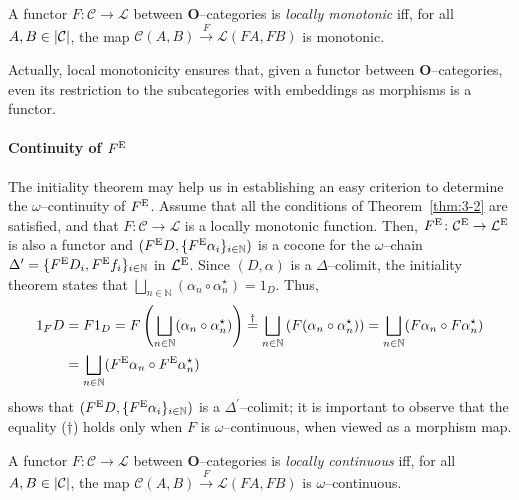 \begin{dfn}
  A functor \(F \colon \mathcal{C} \to \mathcal{L}\) between \(\mathbf{O}\)--categories is \emph{locally monotonic} iff, for all \(A, B \in \lvert \mathcal{C} \rvert\), the map \(\mathcal{C}(A,B) \overset{F}{\to}\mathcal{L}(FA,FB)\) is monotonic.
\end{dfn}

Actually, local monotonicity ensures that, given a functor between \(\mathbf{O}\)--categories, even its restriction to the subcategories with embeddings as morphisms is a functor.

\paragraph{Continuity of \(F^\textup{E}\)}
The initiality theorem may help us in establishing an easy criterion to determine the \(\omega{}\)--continuity of \(F^\textup{E}\).
Assume that all the conditions of Theorem~\ref{thm:3-2} are satisfied, and that \(F \colon \mathcal{C} \to \mathcal{L}\) is a locally monotonic function.
Then, \(F^\textup{E} \colon \mathcal{C}^\textup{E} \to \mathcal{L}^\textup{E}\) is also a functor and \((F^\textup{E}D, \lbrace F^\textup{E}\alpha_i\rbrace_{i \in \mathbb{N}})\) is a cocone for the \(\omega{}\)--chain \(\Delta^\prime = \lbrace F^\textup{E} D_i, F^\textup{E}f_i \rbrace_{i \in \mathbb{N}}\) in \(\mathcal{L}^\textup{E}\).
Since \((D,\alpha)\) is a \(\Delta{}\)--colimit, the initiality theorem states that \(\bigsqcup_{n \in \mathbb{N}}(\alpha_n \circ \alpha_n^\star) = 1_D\).
Thus,
\begin{equation*}
  \begin{split}
    1_FD &= F1_D = F\left(\bigsqcup_{n \in \mathbb{N}}(\alpha_n \circ \alpha_n^\star)\right) \overset{\dagger}{=} \bigsqcup_{n \in \mathbb{N}}\left(F(\alpha_n \circ \alpha_n^\star)\right) = \bigsqcup_{n \in \mathbb{N}}(F\alpha_n \circ F\alpha_n^\star) \\
    &= \bigsqcup_{n \in \mathbb{N}}(F^\textup{E}\alpha_n \circ F^\textup{E}\alpha_n^\star)
  \end{split}
\end{equation*}
shows that \((F^\textup{E}D, \lbrace F^\textup{E}\alpha_i\rbrace_{i \in \mathbb{N}})\) is a \(\Delta^\prime{}\)--colimit; it is important to observe that the equality (\(\dagger{}\)) holds only when \(F\) is \(\omega{}\)--continuous, when viewed as a morphism map.

\begin{dfn}
  A functor \(F \colon \mathcal{C} \to \mathcal{L}\) between \(\mathbf{O}\)--categories is \emph{locally continuous} iff, for all \(A, B \in \lvert \mathcal{C} \rvert\), the map \(\mathcal{C}(A,B) \overset{F}{\to}\mathcal{L}(FA,FB)\) is \(\omega{}\)--continuous.
\end{dfn}

